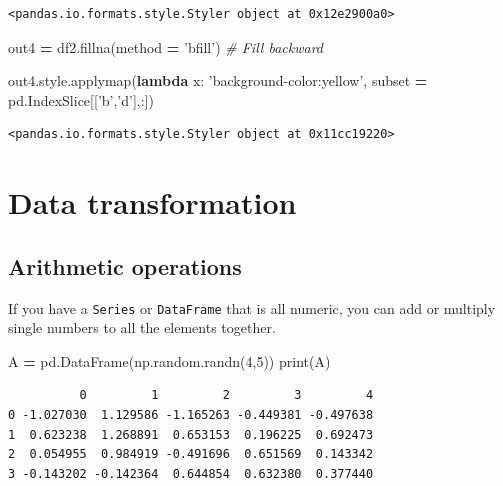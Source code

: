 \documentclass[
  letterpaper,
]{scrbook}
\newenvironment{Shaded}{\begin{snugshade}}{\end{snugshade}}
\newcommand{\BuiltInTok}[1]{#1}
\newcommand{\CommentTok}[1]{\textcolor[rgb]{0.56,0.35,0.01}{\textit{#1}}}
\newcommand{\DecValTok}[1]{\textcolor[rgb]{0.00,0.00,0.81}{#1}}
\newcommand{\KeywordTok}[1]{\textcolor[rgb]{0.13,0.29,0.53}{\textbf{#1}}}
\newcommand{\NormalTok}[1]{#1}
\newcommand{\OperatorTok}[1]{\textcolor[rgb]{0.81,0.36,0.00}{\textbf{#1}}}
\newcommand{\StringTok}[1]{\textcolor[rgb]{0.31,0.60,0.02}{#1}}
\begin{document}
\begin{verbatim}
<pandas.io.formats.style.Styler object at 0x12e2900a0>
\end{verbatim}

\begin{Shaded}
\begin{Highlighting}[]
\NormalTok{out4 }\OperatorTok{=}\NormalTok{ df2.fillna(method }\OperatorTok{=} \StringTok{'bfill'}\NormalTok{) }\CommentTok{# Fill backward}

\NormalTok{out4.style.applymap(}\KeywordTok{lambda}\NormalTok{ x: }\StringTok{'background-color:yellow'}\NormalTok{, subset }\OperatorTok{=}\NormalTok{ pd.IndexSlice[[}\StringTok{'b'}\NormalTok{,}\StringTok{'d'}\NormalTok{],:])}
\end{Highlighting}
\end{Shaded}

\begin{verbatim}
<pandas.io.formats.style.Styler object at 0x11cc19220>
\end{verbatim}

\hypertarget{data-transformation}{%
\section{Data transformation}\label{data-transformation}}

\hypertarget{arithmetic-operations}{%
\subsection{Arithmetic operations}\label{arithmetic-operations}}

If you have a \texttt{Series} or \texttt{DataFrame} that is all numeric, you can add or multiply single numbers to all the elements together.

\begin{Shaded}
\begin{Highlighting}[]
\NormalTok{A }\OperatorTok{=}\NormalTok{ pd.DataFrame(np.random.randn(}\DecValTok{4}\NormalTok{,}\DecValTok{5}\NormalTok{))}
\BuiltInTok{print}\NormalTok{(A)}
\end{Highlighting}
\end{Shaded}

\begin{verbatim}
          0         1         2         3         4
0 -1.027030  1.129586 -1.165263 -0.449381 -0.497638
1  0.623238  1.268891  0.653153  0.196225  0.692473
2  0.054955  0.984919 -0.491696  0.651569  0.143342
3 -0.143202 -0.142364  0.644854  0.632380  0.377440
\end{verbatim}
\end{document}
